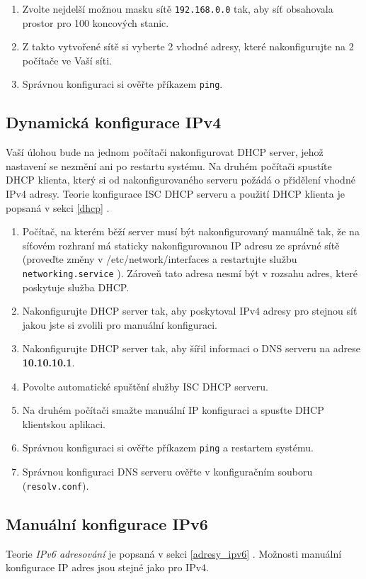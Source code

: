 \begin{enumerate}
    \item Zvolte nejdelší možnou masku sítě \texttt{192.168.0.0} tak, aby síť
        obsahovala prostor pro 100 koncových stanic.
    \item Z takto vytvořené sítě si vyberte 2 vhodné adresy, které
        nakonfigurujte na 2 počítače ve Vaší síti.
    \item Správnou konfiguraci si ověřte příkazem {\tt ping}.
\end{enumerate}

\subsection{Dynamická konfigurace IPv4}

Vaší úlohou bude na jednom počítači nakonfigurovat DHCP server, jehož nastavení se nezmění ani po restartu systému. Na druhém počítači spustíte DHCP klienta, který si od nakonfigurovaného serveru požádá o přidělení vhodné IPv4 adresy. Teorie konfigurace ISC DHCP serveru a použití
DHCP klienta je popsaná v sekci \ref{dhcp} .

\begin{enumerate}
    \item Počítač, na kterém běží server musí být nakonfigurovaný manuálně tak,
        že na síťovém rozhraní má staticky nakonfigurovanou IP adresu ze správné sítě (proveďte změny v /etc/network/interfaces a restartujte službu {\tt networking.service} ). Zároveň tato
        adresa nesmí být v rozsahu adres, které poskytuje služba DHCP.
    \item Nakonfigurujte DHCP server tak, aby poskytoval IPv4 adresy pro stejnou
        síť jakou jste si zvolili pro manuální konfiguraci.
    \item Nakonfigurujte DHCP server tak, aby šířil informaci o DNS serveru na
        adrese {\bf 10.10.10.1}.
    \item Povolte automatické spuštění služby ISC DHCP serveru.
    \item Na druhém počítači smažte manuální IP konfiguraci a spusťte DHCP
        klientskou aplikaci.
    \item Správnou konfiguraci si ověřte příkazem {\tt ping} a restartem systému.
    \item Správnou konfiguraci DNS serveru ověřte v konfiguračním souboru
        (\texttt{resolv.conf}).
\end{enumerate}

\subsection{Manuální konfigurace IPv6}
Teorie \emph{IPv6 adresování} je popsaná v sekci \ref{adresy_ipv6} .
Možnosti manuální konfigurace IP adres jsou stejné jako pro IPv4.

